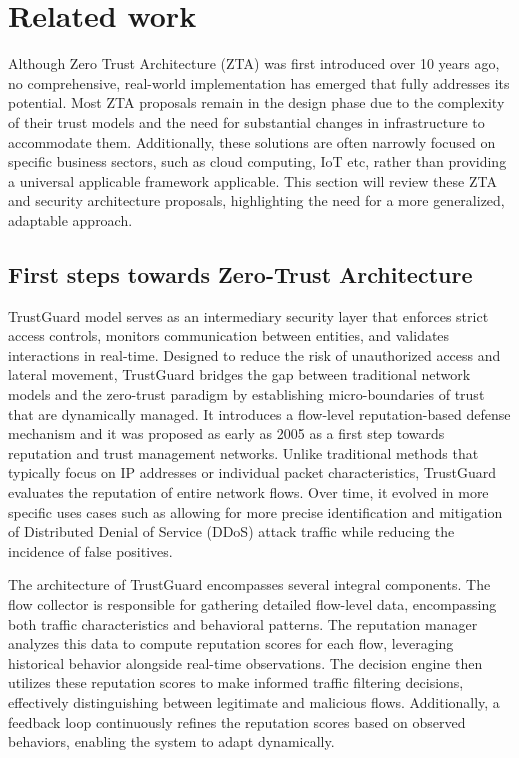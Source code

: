 \section{Related work}
Although Zero Trust Architecture (ZTA) was first introduced over 10 years ago, no comprehensive, real-world implementation has emerged that fully addresses its potential. Most ZTA proposals remain in the design phase due to the complexity of their trust models and the need for substantial changes in infrastructure to accommodate them. Additionally, these solutions are often narrowly focused on specific business sectors, such as cloud computing, IoT etc, rather than providing a universal applicable framework applicable. This section will review these ZTA and security architecture proposals, highlighting the need for a more generalized, adaptable approach.

\subsection{First steps towards Zero-Trust Architecture}
TrustGuard\cite{srivatsa2005trustguard} model serves as an intermediary security layer that enforces strict access controls, monitors communication between entities, and validates interactions in real-time. Designed to reduce the risk of unauthorized access and lateral movement, TrustGuard bridges the gap between traditional network models and the zero-trust paradigm by establishing micro-boundaries of trust that are dynamically managed. It introduces a flow-level reputation-based defense mechanism and it was proposed as early as 2005 as a first step towards reputation and trust management networks. Unlike traditional methods that typically focus on IP addresses or individual packet characteristics, TrustGuard evaluates the reputation of entire network flows. Over time, it evolved in more specific uses cases such as allowing for more precise identification and mitigation of Distributed Denial of Service (DDoS) attack traffic\cite{liu2011trustguard} while reducing the incidence of false positives.

The architecture of TrustGuard encompasses several integral components. The flow collector is responsible for gathering detailed flow-level data, encompassing both traffic characteristics and behavioral patterns. The reputation manager analyzes this data to compute reputation scores for each flow, leveraging historical behavior alongside real-time observations. The decision engine then utilizes these reputation scores to make informed traffic filtering decisions, effectively distinguishing between legitimate and malicious flows. Additionally, a feedback loop continuously refines the reputation scores based on observed behaviors, enabling the system to adapt dynamically.

